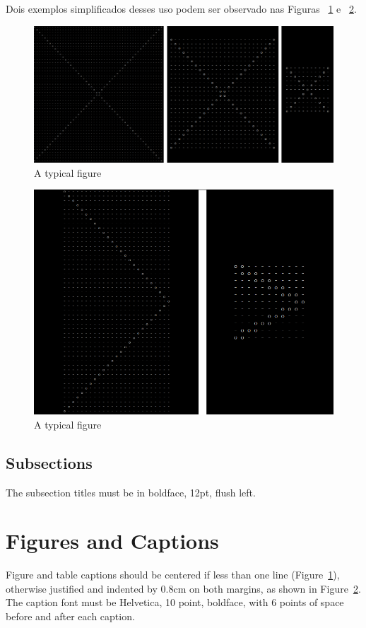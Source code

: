 \documentclass[12pt]{article}
\begin{document}
Dois exemplos simplificados desses uso podem ser observado nas Figuras ~\ref{fig:exampleFig1} e ~\ref{fig:exampleFig2}.

\begin{figure}[ht]
\centering
\includegraphics[width=1\textwidth]{50X25X10.png}
\caption{A typical figure}
\label{fig:exampleFig1}
\end{figure}

\begin{figure}[ht]
\centering
\includegraphics[width=.5\textwidth]{50.25x10.10.png}
\caption{A typical figure}
\label{fig:exampleFig2}
\end{figure}

\subsection{Subsections}

The subsection titles must be in boldface, 12pt, flush left.

\section{Figures and Captions}\label{sec:figs}


Figure and table captions should be centered if less than one line
(Figure~\ref{fig:exampleFig1}), otherwise justified and indented by 0.8cm on
both margins, as shown in Figure~\ref{fig:exampleFig2}. The caption font must
be Helvetica, 10 point, boldface, with 6 points of space before and after each
caption.
\end{document}

